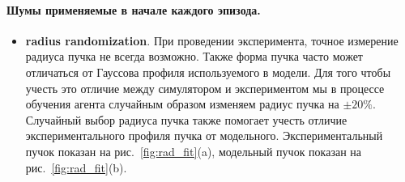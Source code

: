 \paragraph{Шумы применяемые в начале каждого эпизода.} 
\begin{itemize}
    \item \textbf{radius randomization}. При проведении эксперимента, точное измерение радиуса пучка не всегда возможно. Также форма пучка часто может отличаться от Гауссова профиля используемого в модели. Для того чтобы учесть это отличие между симулятором и экспериментом мы в процессе обучения агента случайным образом изменяем радиус пучка на $\pm 20\%$. Случайный выбор радиуса пучка также помогает учесть отличие экспериментального профиля пучка от модельного. Экспериментальный пучок показан на рис.~\ref{fig:rad_fit}(a), модельный пучок показан на рис.~\ref{fig:rad_fit}(b).
\end{itemize}

